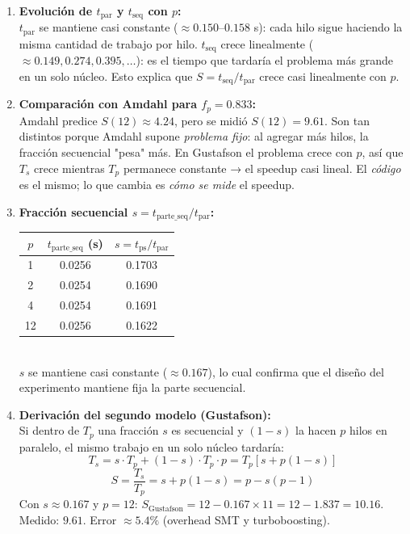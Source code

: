 \documentclass[12pt,letterpaper]{article}
\begin{document}
\begin{enumerate}

\item \textbf{Evolución de $t_{\text{par}}$ y $t_{\text{seq}}$ con $p$:}\\
$t_{\text{par}}$ se mantiene casi constante ($\approx 0.150$–$0.158$ s): cada hilo sigue haciendo la misma cantidad de trabajo por hilo. $t_{\text{seq}}$ crece linealmente ($\approx 0.149, 0.274, 0.395, \ldots$): es el tiempo que tardaría el problema más grande en un solo núcleo. Esto explica que $S = t_{\text{seq}}/t_{\text{par}}$ crece casi linealmente con $p$.

\item \textbf{Comparación con Amdahl para $f_p = 0.833$:}\\
Amdahl predice $S(12) \approx 4.24$, pero se midió $S(12) = 9.61$. Son tan distintos porque Amdahl supone \emph{problema fijo}: al agregar más hilos, la fracción secuencial "pesa" más. En Gustafson el problema crece con $p$, así que $T_s$ crece mientras $T_p$ permanece constante → el speedup casi lineal. El \emph{código} es el mismo; lo que cambia es \emph{cómo se mide} el speedup.

\item \textbf{Fracción secuencial $s = t_{\text{parte\_seq}} / t_{\text{par}}$:}\\
\begin{tabular}{ccc}
\toprule
$p$ & $t_{\text{parte\_seq}}$ (s) & $s = t_{\text{ps}}/t_{\text{par}}$ \\
\midrule
1 & 0.0256 & 0.1703 \\
2 & 0.0254 & 0.1690 \\
4 & 0.0254 & 0.1691 \\
12 & 0.0256 & 0.1622 \\
\bottomrule
\end{tabular}\\[4pt]
$s$ se mantiene casi constante ($\approx 0.167$), lo cual confirma que el diseño del experimento mantiene fija la parte secuencial.

\item \textbf{Derivación del segundo modelo (Gustafson):}\\
Si dentro de $T_p$ una fracción $s$ es secuencial y $(1-s)$ la hacen $p$ hilos en paralelo, el mismo trabajo en un solo núcleo tardaría:
\[
T_s = s \cdot T_p + (1-s) \cdot T_p \cdot p = T_p\left[s + p(1-s)\right]
\]
\[
\boxed{S = \frac{T_s}{T_p} = s + p(1-s) = p - s(p-1)}
\]
Con $s \approx 0.167$ y $p = 12$: $S_{\text{Gustafson}} = 12 - 0.167 \times 11 = 12 - 1.837 = \mathbf{10.16}$. Medido: $9.61$. Error $\approx 5.4\%$ (overhead SMT y turboboosting).


\end{enumerate}
\end{document}
